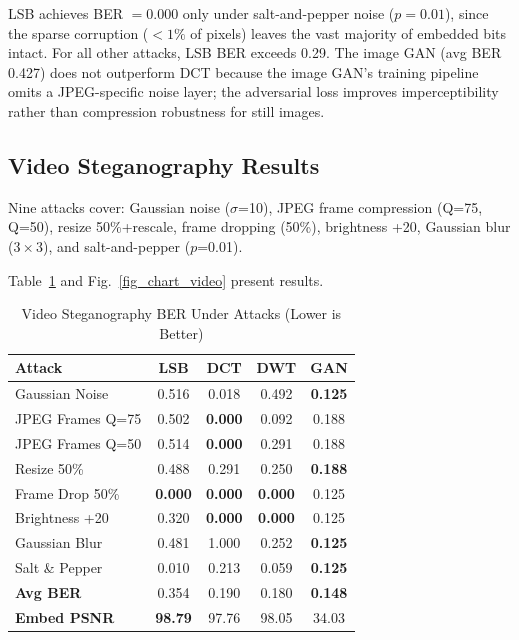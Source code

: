 \documentclass[conference]{IEEEtran}
\begin{document}
LSB achieves BER $= 0.000$ only under salt-and-pepper noise ($p=0.01$),
since the sparse corruption ($<1\%$ of pixels) leaves the vast majority
of embedded bits intact. For all other attacks, LSB BER exceeds 0.29.
The image GAN (avg BER 0.427) does not outperform DCT because the
image GAN's training pipeline omits a JPEG-specific noise layer; the
adversarial loss improves imperceptibility rather than compression
robustness for still images.

\subsection{Video Steganography Results}

Nine attacks cover: Gaussian noise ($\sigma$=10), JPEG frame
compression (Q=75, Q=50), resize 50\%+rescale, frame dropping (50\%),
brightness +20, Gaussian blur ($3{\times}3$), and salt-and-pepper
($p$=0.01).

Table~\ref{tab_video} and Fig.~\ref{fig_chart_video} present results.

\begin{table}[htbp]
\caption{Video Steganography BER Under Attacks (Lower is Better)}
\begin{center}
\begin{tabular}{|l|c|c|c|c|}
\hline
\textbf{Attack}    & \textbf{LSB} & \textbf{DCT} & \textbf{DWT} & \textbf{GAN} \\
\hline
Gaussian Noise     & 0.516 & 0.018 & 0.492 & \textbf{0.125} \\
JPEG Frames Q=75   & 0.502 & \textbf{0.000} & 0.092 & 0.188 \\
JPEG Frames Q=50   & 0.514 & \textbf{0.000} & 0.291 & 0.188 \\
Resize 50\%        & 0.488 & 0.291 & 0.250 & \textbf{0.188} \\
Frame Drop 50\%    & \textbf{0.000} & \textbf{0.000} & \textbf{0.000} & 0.125 \\
Brightness +20     & 0.320 & \textbf{0.000} & \textbf{0.000} & 0.125 \\
Gaussian Blur      & 0.481 & 1.000 & 0.252 & \textbf{0.125} \\
Salt \& Pepper     & 0.010 & 0.213 & 0.059 & \textbf{0.125} \\
\hline
\textbf{Avg BER}   & 0.354 & 0.190 & 0.180 & \textbf{0.148} \\
\textbf{Embed PSNR}& \textbf{98.79} & 97.76 & 98.05 & 34.03 \\
\hline
\end{tabular}
\label{tab_video}
\end{center}
\end{table}
\end{document}
